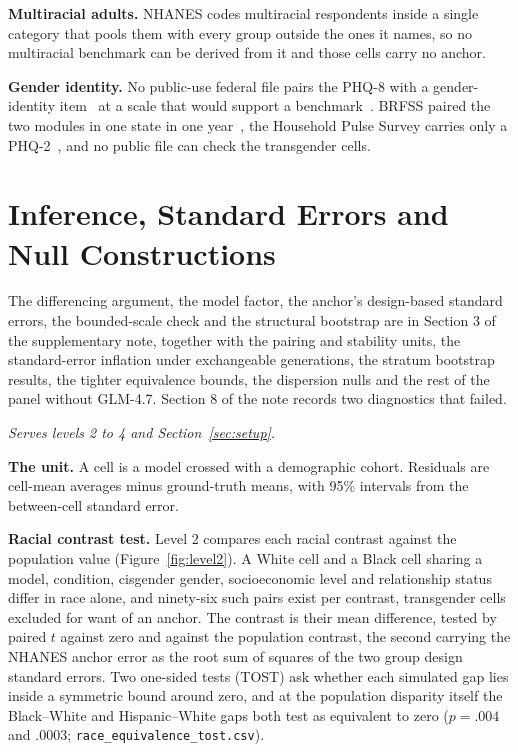 \documentclass[wcp]{jmlr}
\let\cite\citep
\begin{document}
\textbf{Multiracial adults.} NHANES codes multiracial respondents inside a single category that pools them with every group outside the ones it names, so no multiracial benchmark can be derived from it and those cells carry no anchor.

\textbf{Gender identity.} No public-use federal file pairs the PHQ-8 with a gender-identity item~\cite{nasem2022measuring} at a scale that would support a benchmark~\cite{nchs2022srvydesc,nchs2024srvydesc,eo14168}. BRFSS paired
the two modules in one state in one year~\cite{cdc2015brfssmodules}, the Household Pulse Survey
carries only a PHQ-2~\cite{census2022hps}, and no public file can check the transgender cells.

\section{Inference, Standard Errors and Null Constructions}
\label{app:inference}
\noindent The differencing argument, the model factor, the anchor's design-based standard errors, the bounded-scale check and the structural bootstrap are in Section 3 of the supplementary note, together with the pairing and stability units, the standard-error inflation under exchangeable generations, the stratum bootstrap results, the tighter equivalence bounds, the dispersion nulls and the rest of the panel without GLM-4.7. Section 8 of the note records two diagnostics that failed.

\noindent\emph{Serves levels 2 to 4 and Section~\ref{sec:setup}.}

\textbf{The unit.} A cell is a model crossed with a demographic cohort. Residuals are cell-mean averages minus ground-truth means, with 95\% intervals from the between-cell standard error.

\textbf{Racial contrast test.} Level 2 compares each racial contrast against the population value (Figure~\ref{fig:level2}). A White cell and a Black cell sharing a model, condition, cisgender gender, socioeconomic level and relationship status differ in race alone, and ninety-six such pairs exist per contrast, transgender cells excluded for want of an anchor. The contrast is their mean difference, tested by paired $t$ against zero and against the population contrast, the second carrying the NHANES anchor error as the root sum of squares of the two group design standard errors. Two one-sided tests (TOST) ask whether each simulated gap lies inside a symmetric bound around zero, and at the population disparity itself the Black--White and Hispanic--White gaps both test as equivalent to zero ($p = .004$ and $.0003$; \texttt{race\_equivalence\_tost.csv}).
\end{document}
